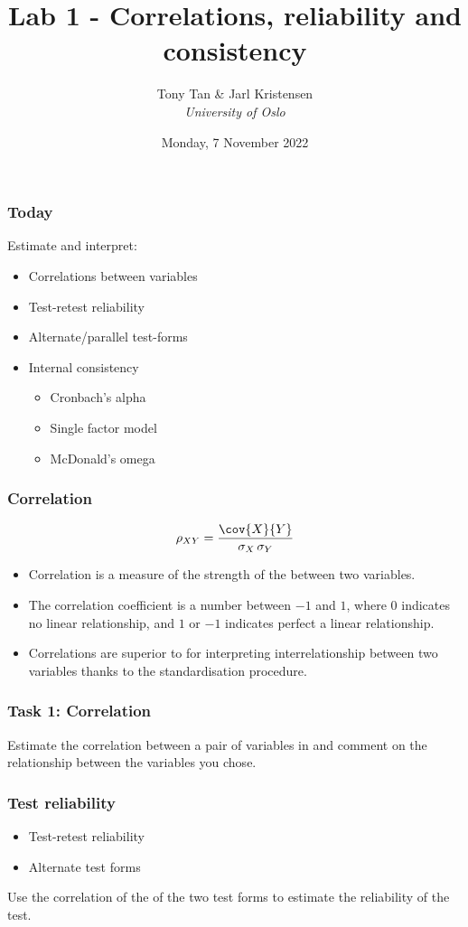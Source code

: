 \documentclass[compress]{beamer}\usepackage[]{graphicx}\usepackage[]{xcolor}
\title{Lab 1 - Correlations, reliability and consistency}
\author[]{Tony Tan \& Jarl Kristensen \\\vspace{6pt} {\em{University of Oslo}} }
\date{Monday, 7 November 2022}
\begin{document}
\begin{frame}[fragile]
\titlepage
\end{frame}


\begin{frame}[fragile]
	\frametitle{Today}
	Estimate and interpret:
		\begin{itemize}
			\item Correlations between variables
			\item Test-retest reliability
			\item Alternate/parallel test-forms
			\item Internal consistency
				\begin{itemize}
					\item Cronbach's alpha
					\item Single factor model
					\item McDonald's omega
				\end{itemize}
		\end{itemize}
\end{frame}


\begin{frame}[fragile]
	\frametitle{Correlation}

			\[ \rho_{XY} = \frac{\cov{X}{Y}}{\sigma_X \, \sigma_Y} \]

		\begin{itemize}
			\item Correlation is a measure of the strength of the  between two variables.
			\item The correlation coefficient is a number between $-1$ and $1$, where $0$ indicates no linear relationship, and $1$ or $-1$ indicates perfect a linear relationship.
			\item Correlations are superior to  for interpreting interrelationship between two variables thanks to the standardisation procedure.
		\end{itemize}
\end{frame}


\begin{frame}[fragile]
	\frametitle{Task 1: Correlation}
		Estimate the correlation between a pair of variables in  and comment on the relationship between the variables you chose.
\end{frame}


\begin{frame}[fragile]
	\frametitle{Test reliability}
		\begin{itemize}
			\item Test-retest reliability
			\item Alternate test forms
		\end{itemize}

		Use the correlation of the  of the two test forms to estimate the reliability of the test.
\end{frame}
\end{document}
